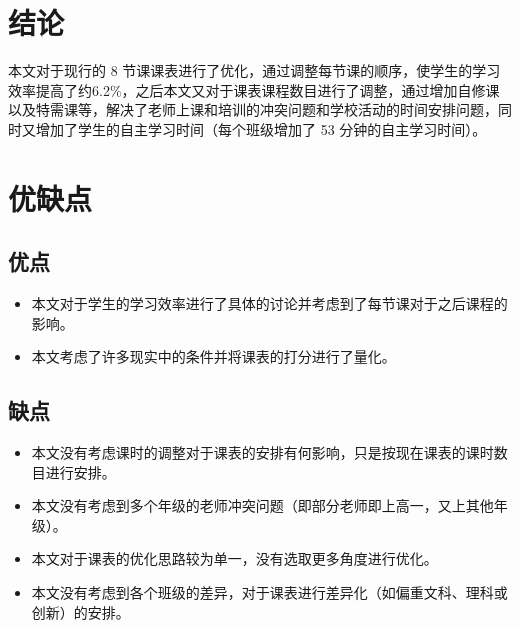 \documentclass[a4paper]{article}
\begin{document}
\clearpage

\section{结论}

 本文对于现行的 8 节课课表进行了优化，通过调整每节课的顺序，使学生的学习效率提高了约6.2\%，之后本文又对于课表课程数目进行了调整，通过增加自修课以及特需课等，解决了老师上课和培训的冲突问题和学校活动的时间安排问题，同时又增加了学生的自主学习时间（每个班级增加了 53 分钟的自主学习时间）。

\clearpage

\section{优缺点}

 \subsection{优点}

  \begin{itemize}

  \item 本文对于学生的学习效率进行了具体的讨论并考虑到了每节课对于之后课程的影响。

  \item 本文考虑了许多现实中的条件并将课表的打分进行了量化。

  \end{itemize}

 \subsection{缺点}

  \begin{itemize}

  \item 本文没有考虑课时的调整对于课表的安排有何影响，只是按现在课表的课时数目进行安排。

  \item 本文没有考虑到多个年级的老师冲突问题（即部分老师即上高一，又上其他年级）。

  \item 本文对于课表的优化思路较为单一，没有选取更多角度进行优化。

  \item 本文没有考虑到各个班级的差异，对于课表进行差异化（如偏重文科、理科或创新）的安排。

  \end{itemize}
\end{document}
